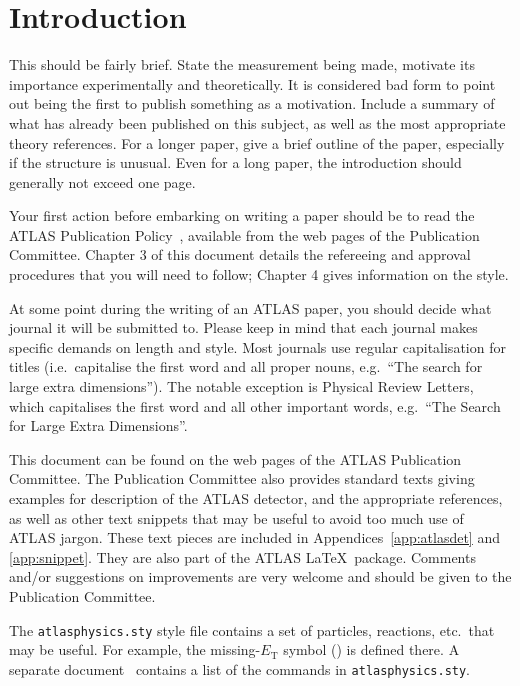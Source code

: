\documentclass[UKenglish]{latex/atlasdoc}
\begin{document}
\section{Introduction}
\label{sec:intro}

This should be fairly brief. 
State the measurement being made, motivate its importance experimentally and theoretically.
It is considered bad form to point out being the first to publish something as a motivation.
Include a summary of what has already been published on this subject, as well as the most appropriate theory references.
For a longer paper, give a brief outline of the paper, especially if the structure is unusual.
Even for a long paper, the introduction should generally not exceed one page.

Your first action before embarking on writing a paper should be to
read the ATLAS Publication Policy~\cite{publication-policy}, available
from the web pages of the Publication Committee. Chapter 3 of this
document details the refereeing and approval procedures that you will
need to follow; Chapter 4 gives information on the style.

At some point during the writing of an ATLAS paper, you should decide what journal it will be submitted to.
Please keep in mind that each journal makes specific demands on length and style.
Most journals use regular capitalisation for titles 
(i.e.\ capitalise the first word and all proper nouns, 
e.g.\ \enquote{The search for large extra dimensions}). 
The notable exception is Physical Review Letters, which capitalises the
first word and all other important words,
e.g.\ \enquote{The Search for Large Extra Dimensions}.

This document can be found on the web pages of the ATLAS Publication Committee. 
The Publication Committee also provides standard texts giving examples
for description of the ATLAS detector, and the appropriate references,
as well as other text snippets that may be useful to avoid too much use of ATLAS jargon.
These text pieces are included in Appendices~\ref{app:atlasdet} and \ref{app:snippet}.
They are also part of the ATLAS \LaTeX\ package.
Comments and/or suggestions on improvements are very welcome and
should be given to the Publication Committee.

The \texttt{atlasphysics.sty} style file contains a set of particles,
reactions, etc.\ that may be useful. For example, the missing-$E_{\text{T}}$
symbol (\met{}) is defined there. 
A separate document~\cite{atlas-physics}
contains a list of the commands in \texttt{atlasphysics.sty}.
\end{document}
